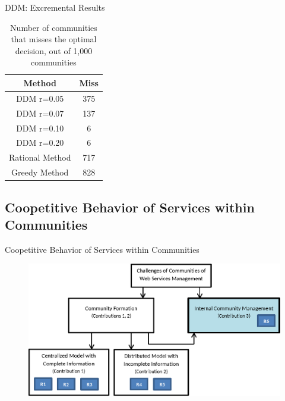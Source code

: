 \documentclass{beamer}
\begin{document}
\begin{frame}{DDM: Excremental Results}
    \begin{table}[ht]
        \caption{Number of communities that misses the optimal decision, out of 1,000 communities} %
        \centering %
        \begin{tabular}{|c|c|} %
        \hline %
         Method&Miss \\ [0.5ex] %
        \hline %
         DDM r=0.05& 375 \\ %
         DDM r=0.07& 137 \\
         DDM r=0.10& 6 \\
         DDM r=0.20& 6 \\
        Rational Method& 717 \\
        Greedy Method& 828 \\ [1ex] %
        \hline %
        \end{tabular}
        \label{fail_rate} %
    \end{table}
\end{frame}

\subsection{Coopetitive Behavior of Services within Communities}
\begin{frame}{Coopetitive Behavior of Services within Communities}
    \begin{figure}[htbp]
        \centering
        \includegraphics[width=0.9 \columnwidth]{figures/model_c3.eps}
    \end{figure}
\end{frame}
\end{document}
